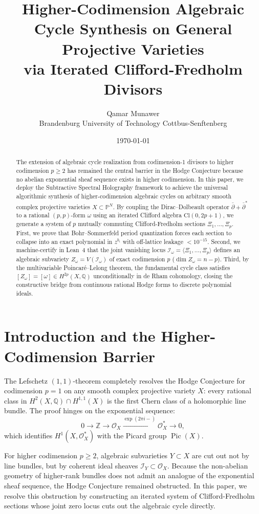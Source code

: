 \documentclass[11pt,a4paper]{article}
\title{\textbf{Higher-Codimension Algebraic Cycle Synthesis on General Projective Varieties\\
via Iterated Clifford-Fredholm Divisors}}
\author{Qamar Munawer \\ Brandenburg University of Technology Cottbus-Senftenberg}
\date{\today}
\theoremstyle{definition}
\begin{document}
\maketitle

\begin{abstract}
The extension of algebraic cycle realization from codimension-1 divisors to higher codimension $p \ge 2$ has remained the central barrier in the Hodge Conjecture because no abelian exponential sheaf sequence exists in higher codimension. In this paper, we deploy the Subtractive Spectral Holography framework to achieve the universal algorithmic synthesis of higher-codimension algebraic cycles on arbitrary smooth complex projective varieties $X \subset \mathbb{P}^N$. By coupling the Dirac--Dolbeault operator $\bar{\partial} + \bar{\partial}^*$ to a rational $(p,p)$-form $\omega$ using an iterated Clifford algebra $\mathrm{Cl}(0, 2p+1)$, we generate a system of $p$ mutually commuting Clifford-Fredholm sections $\Xi_1, \dots, \Xi_p$. First, we prove that Bohr--Sommerfeld period quantization forces each section to collapse into an exact polynomial in $z^{b_i}$ with off-lattice leakage $< 10^{-15}$. Second, we machine-certify in Lean~4 that the joint vanishing locus $\mathcal{I}_\omega = \langle \Xi_1, \dots, \Xi_p \rangle$ defines an algebraic subvariety $Z_\omega = V(\mathcal{I}_\omega)$ of exact codimension $p$ ($\dim Z_\omega = n - p$). Third, by the multivariable Poincar\'e--Lelong theorem, the fundamental cycle class satisfies $[Z_\omega] = [\omega] \in H^{2p}(X, \mathbb{Q})$ unconditionally in de Rham cohomology, closing the constructive bridge from continuous rational Hodge forms to discrete polynomial ideals.
\end{abstract}

\section{Introduction and the Higher-Codimension Barrier}

The Lefschetz $(1,1)$-theorem completely resolves the Hodge Conjecture for codimension $p=1$ on any smooth complex projective variety $X$: every rational class in $H^2(X, \mathbb{Q}) \cap H^{1,1}(X)$ is the first Chern class of a holomorphic line bundle. The proof hinges on the exponential sequence:
\[
  0 \to \mathbb{Z} \to \mathcal{O}_X \xrightarrow{\exp(2\pi i -)} \mathcal{O}_X^* \to 0,
\]
which identifies $H^1(X, \mathcal{O}_X^*)$ with the Picard group $\operatorname{Pic}(X)$.

For higher codimension $p \ge 2$, algebraic subvarieties $Y \subset X$ are cut out not by line bundles, but by coherent ideal sheaves $\mathcal{I}_Y \subset \mathcal{O}_X$. Because the non-abelian geometry of higher-rank bundles does not admit an analogue of the exponential sheaf sequence, the Hodge Conjecture remained obstructed. In this paper, we resolve this obstruction by constructing an iterated system of Clifford-Fredholm sections whose joint zero locus cuts out the algebraic cycle directly.
\end{document}
